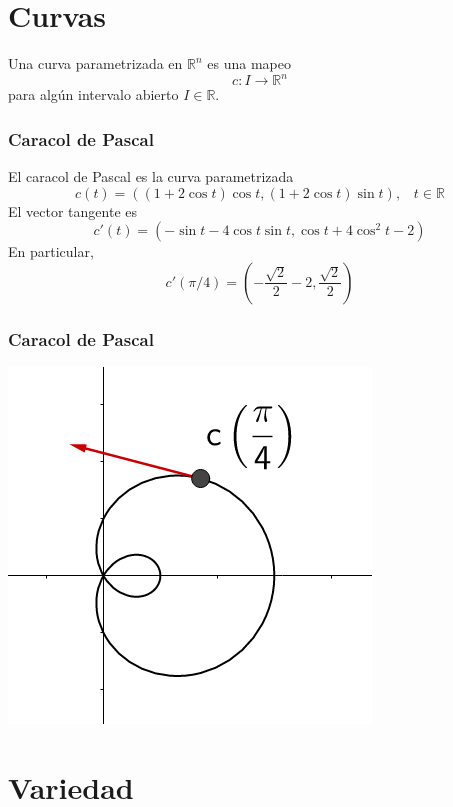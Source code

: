 \documentclass[spanish]{beamer}
\def\realR{\mathbb{R}} %
\begin{document}
\section{Curvas}

\begin{frame}
    \begin{definition}
        Una curva parametrizada en $\realR^{n}$ es una mapeo 
        $$c:I \rightarrow \realR^{n}$$
        para alg\'un intervalo abierto $I \in \realR$.
    \end{definition}
\end{frame}

\begin{frame}
    \frametitle{Caracol de Pascal}
    El caracol de Pascal es la curva parametrizada
    $$ c(t)=((1+2\cos{t})\cos{t},(1+2\cos{t})\sin{t})\text{,} \quad t \in \realR$$
    El vector tangente es
    $$ c'(t)=(-\sin{t}-4\cos{t}\sin{t},\cos{t}+4\cos^{2}{t}-2)$$
    En particular,
    $$ c'(\pi/4) = (-\frac{\sqrt{2}}{2}-2,\frac{\sqrt{2}}{2})$$
\end{frame}

\begin{frame}
    \frametitle{Caracol de Pascal}
    \begin{center}
    \includegraphics[scale=0.5]{../gfx/limacon2}
    \end{center}
\end{frame}

\section{Variedad}
\end{document}
